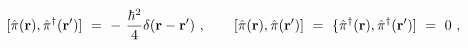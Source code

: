 \begin{equation}
\lbrack \hat{\pi}({\bf r}),\hat{\pi}^{\dagger }({\bf r^{\prime }})]\ =\ -{\ 
\frac{\hbar ^{2}}{4}}\delta ({\bf r}-{\bf r^{\prime }})\ ,\qquad \lbrack 
\hat{\pi}({\bf r}),\hat{\pi}({\bf r^{\prime }})]\ =\ \{\hat{\pi}^{\dagger }(%
{\bf r}),\hat{\pi}^{\dagger }({\bf r^{\prime }})]\ =\ 0\ ,  \label{comm2}
\end{equation}%
